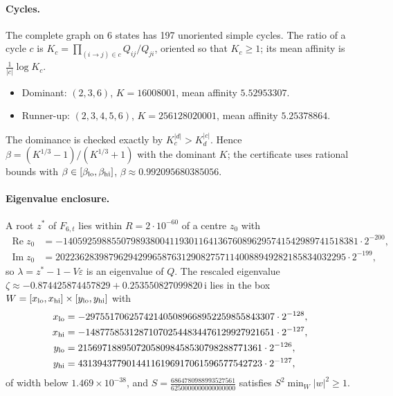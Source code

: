 \documentclass[11pt,a4paper]{article}
\numberwithin{equation}{section}
\theoremstyle{definition}
\theoremstyle{remark}
\newcommand{\ii}{\mathrm{i}}
\newcommand{\eps}{\varepsilon}
\begin{document}
\paragraph{Cycles.} The complete graph on 6 states has 197 unoriented simple cycles. The ratio of a cycle \(c\) is \(K_c=\prod_{(i\to j)\in c}Q_{ij}/Q_{ji}\), oriented so that \(K_c\ge1\); its mean affinity is \(\frac1{|c|}\log K_c\).
\begin{itemize}
\item Dominant: \((2,3,6)\), \(K=16008001\), mean affinity \(5.52953307\).
\item Runner-up: \((2,3,4,5,6)\), \(K=256128020001\), mean affinity \(5.25378864\).
\end{itemize}
The dominance is checked exactly by \(K_c^{|d|}>K_d^{|c|}\). Hence \(\beta=(K^{1/3}-1)/(K^{1/3}+1)\) with the dominant \(K\); the certificate uses rational bounds with \(\beta\in[\beta_{\rm lo},\beta_{\rm hi}]\), \(\beta\approx0.992095680385056\).

\paragraph{Eigenvalue enclosure.} A root \(z^*\) of \(F_{6,t}\) lies within \(R=2\cdot10^{-60}\) of
a centre \(z_0\) with
\begin{align*}
\operatorname{Re}z_0&=-1405925988550798938004119301164136760896295741542989741518381\cdot2^{-200},\\
\operatorname{Im}z_0&=202236283987962942996587631290827571140088949282185834032295\cdot2^{-199},
\end{align*}
so \(\lambda=z^*-1-V\eps\) is an eigenvalue of \(Q\). The rescaled eigenvalue \(\zeta\approx-0.874425874457829+0.253550827099820\,\ii\) lies in the box \(W=[x_{\rm lo},x_{\rm hi}]\times[y_{\rm lo},y_{\rm hi}]\) with
\begin{align*}
x_{\rm lo}&=-297551706257421405089668952259855843307\cdot2^{-128},\\ x_{\rm hi}&=-148775853128710702544834476129927921651\cdot2^{-127},\\
y_{\rm lo}&=21569718895072058098458530798288771361\cdot2^{-126},\\ y_{\rm hi}&=43139437790144116196917061596577542723\cdot2^{-127},
\end{align*}
of width below \(1.469\times10^{-38}\), and \(S=\tfrac{6864780988993527561}{6250000000000000000}\) satisfies \(S^2\min_W|w|^2\ge1\).
\end{document}
